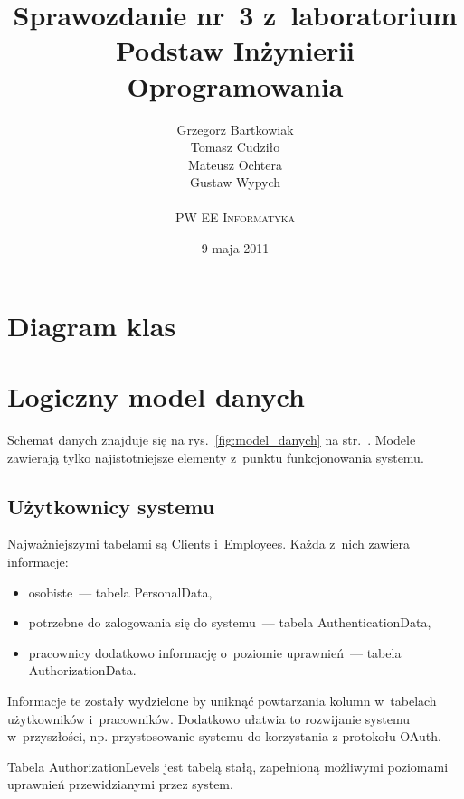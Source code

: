\documentclass[10pt,a4paper]{article}
\newcommand{\s}[1]{\textsf{#1}}
\begin{document}
\title{
  Sprawozdanie nr~3 z~laboratorium\\Podstaw Inżynierii Oprogramowania
}
\author{
  Grzegorz Bartkowiak\\
  Tomasz Cudziło\\
  Mateusz Ochtera\\
  Gustaw Wypych\\
  \\
  \textsc{PW EE Informatyka}\\[10pt]
}
\date{9 maja 2011}
\maketitle

\section{Diagram klas}

\section{Logiczny model danych}

Schemat danych znajduje się na rys.~\ref{fig:model_danych} na
str.~\pageref{fig:model_danych}. Modele zawierają tylko najistotniejsze
elementy z~punktu funkcjonowania systemu.

\subsection{Użytkownicy systemu}

\noindent Najważniejszymi tabelami są \s{Clients} i~\s{Employees}. Każda z~nich
zawiera informacje:

\begin{itemize}
  \item osobiste~--- tabela \s{PersonalData},
  \item potrzebne do zalogowania się do systemu~--- tabela
    \s{AuthenticationData},
  \item pracownicy dodatkowo informację o~poziomie uprawnień~--- tabela
    \s{AuthorizationData}.
\end{itemize}

Informacje te zostały wydzielone by uniknąć powtarzania kolumn w~tabelach
użytkowników i~pracowników. Dodatkowo ułatwia to rozwijanie systemu
w~przyszłości, np. przystosowanie systemu do korzystania z protokołu OAuth.

Tabela \s{AuthorizationLevels} jest tabelą stałą, zapełnioną możliwymi
poziomami uprawnień przewidzianymi przez system.
\end{document}
